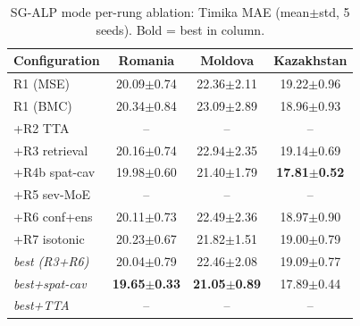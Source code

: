 \begin{table}[t]
\centering\small
\caption{SG-ALP mode per-rung ablation: Timika MAE (mean$\pm$std, 5 seeds). Bold = best in column.}
\label{tab:abl_a1}
\setlength{\tabcolsep}{4pt}
\begin{tabular}{l c c c}
\toprule
Configuration & Romania & Moldova & Kazakhstan \\
\midrule
R1 (MSE) & 20.09$\pm$0.74 & 22.36$\pm$2.11 & 19.22$\pm$0.96 \\
R1 (BMC) & 20.34$\pm$0.84 & 23.09$\pm$2.89 & 18.96$\pm$0.93 \\
+R2 TTA & -- & -- & -- \\
+R3 retrieval & 20.16$\pm$0.74 & 22.94$\pm$2.35 & 19.14$\pm$0.69 \\
+R4b spat-cav & 19.98$\pm$0.60 & 21.40$\pm$1.79 & \textbf{17.81$\pm$0.52} \\
+R5 sev-MoE & -- & -- & -- \\
+R6 conf+ens & 20.11$\pm$0.73 & 22.49$\pm$2.36 & 18.97$\pm$0.90 \\
+R7 isotonic & 20.23$\pm$0.67 & 21.82$\pm$1.51 & 19.00$\pm$0.79 \\
\textit{best (R3+R6)} & 20.04$\pm$0.79 & 22.46$\pm$2.08 & 19.09$\pm$0.77 \\
\textit{best+spat-cav} & \textbf{19.65$\pm$0.33} & \textbf{21.05$\pm$0.89} & 17.89$\pm$0.44 \\
\textit{best+TTA} & -- & -- & -- \\
\bottomrule
\end{tabular}
\end{table}
